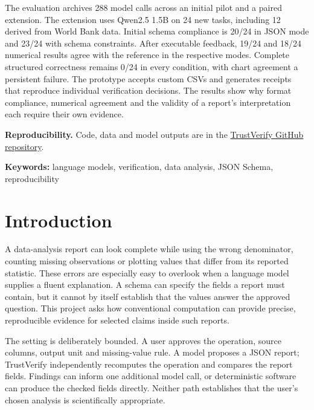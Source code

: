 The evaluation archives 288 model calls across an initial pilot and a paired extension. The extension uses Qwen2.5 1.5B on 24 new tasks, including 12 derived from World Bank data. Initial schema compliance is 20/24 in JSON mode and 23/24 with schema constraints. After executable feedback, 19/24 and 18/24 numerical results agree with the reference in the respective modes. Complete structured correctness remains 0/24 in every condition, with chart agreement a persistent failure. The prototype accepts custom CSVs and generates receipts that reproduce individual verification decisions. The results show why format compliance, numerical agreement and the validity of a report's interpretation each require their own evidence.

\vspace{3mm}
\noindent\textbf{Reproducibility.} Code, data and model outputs are in the \href{https://github.com/naazzarov/trustverify-ai-analysis}{\textcolor{Cobalt}{TrustVerify GitHub repository}}.

\vspace{4mm}
\noindent\textbf{Keywords:} language models, verification, data analysis, JSON Schema, reproducibility
\clearpage
\setcounter{tocdepth}{2}
\begingroup\small{}
\tableofcontents
\endgroup
\clearpage
{}

\section{Introduction}
A data-analysis report can look complete while using the wrong denominator, counting missing observations or plotting values that differ from its reported statistic. These errors are especially easy to overlook when a language model supplies a fluent explanation. A schema can specify the fields a report must contain, but it cannot by itself establish that the values answer the approved question. This project asks how conventional computation can provide precise, reproducible evidence for selected claims inside such reports.

The setting is deliberately bounded. A user approves the operation, source columns, output unit and missing-value rule. A model proposes a JSON report; TrustVerify independently recomputes the operation and compares the report fields. Findings can inform one additional model call, or deterministic software can produce the checked fields directly. Neither path establishes that the user's chosen analysis is scientifically appropriate.

